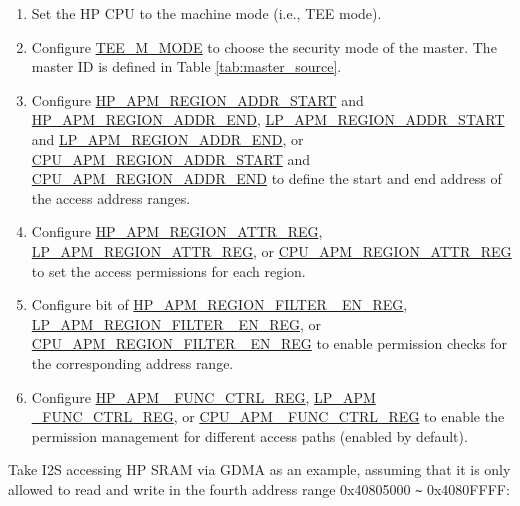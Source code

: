 \documentclass[main\_\_EN.tex]{subfiles}
\begin{document}
\begin{enumerate}

    \item Set the HP CPU to the machine mode (i.e., TEE mode).
    \item Configure \hyperref[fielddesc:TEEMNMODE]{TEE\_M\_MODE} to choose the security mode of the master. The master ID  is defined in Table \ref{tab:master_source}.

    \item Configure \hyperref[regdesc:HPAPMREGIONNADDRSTARTREG]{HP\_APM\_REGION\_ADDR\_START} and \hyperref[regdesc:HPAPMREGIONNADDRENDREG]{HP\_APM\_REGION\_ADDR\_END}, \hyperref[regdesc:LPAPMREGIONNADDRSTARTREG]{LP\_APM\_REGION\_ADDR\_START} and \hyperref[regdesc:LPAPMREGIONNADDRENDREG]{LP\_APM\_REGION\_ADDR\_END}, or \hyperref[regdesc:CPUAPMREGIONNADDRSTARTREG]{CPU\_APM\_REGION\_ADDR\_START} and \hyperref[regdesc:CPUAPMREGIONNADDRENDREG]{CPU\_APM\_REGION\_ADDR\_END} to define the start and end address of the access address ranges.

    \item Configure \hyperref[regdesc:HPAPMREGIONNATTRREG]{HP\_APM\_REGION\_ATTR\_REG}, \hyperref[regdesc:LPAPMREGIONNATTRREG]{LP\_APM\_REGION\_ATTR\_REG}, or \hyperref[regdesc:CPUAPMREGIONNATTRREG]{CPU\_APM\_REGION\_ATTR\_REG} to set the access permissions for each region.


    \item Configure bit  of \hyperref[fielddesc:HPAPMREGIONFILTEREN]{HP\_APM\_REGION\_FILTER\_ EN\_REG}, \hyperref[fielddesc:LPAPMREGIONFILTEREN]{LP\_APM\_REGION\_FILTER\_ EN\_REG}, or \hyperref[fielddesc:CPUAPMREGIONFILTEREN]{CPU\_APM\_REGION\_FILTER\_ EN\_REG} to enable permission checks for the corresponding address range.

    \item Configure \hyperref[regdesc:HPAPMFUNCCTRLREG]{HP\_APM\_ FUNC\_CTRL\_REG}, \hyperref[regdesc:LPAPMFUNCCTRLREG]{LP\_APM \_FUNC\_CTRL\_REG}, or \hyperref[regdesc:CPUAPMFUNCCTRLREG]{CPU\_APM \_FUNC\_CTRL\_REG} to enable the permission management for different access paths (enabled by default).

\end{enumerate}

Take I2S accessing HP SRAM via GDMA as an example, assuming that it is only allowed to read and write in the fourth address range 0x40805000 \verb+~+ 0x4080FFFF:
\end{document}
